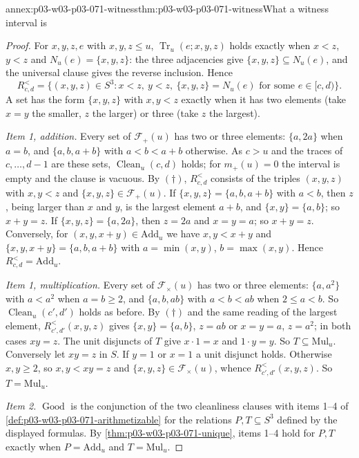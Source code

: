 \begin{annexitem}{annex:p03-w03-p03-071-witness}{thm:p03-w03-p03-071-witness}{What a witness interval is}
\begin{proof}
For \(x,y,z,e\) with \(x,y,z\leq u\), \(\operatorname{Tr}_u(e;x,y,z)\) holds
exactly when \(x<z\), \(y<z\) and \(N_u(e)=\{x,y,z\}\): the three adjacencies
give \(\{x,y,z\}\subseteq N_u(e)\), and the universal clause gives the
reverse inclusion.  Hence
\[
  R^<_{c,d}=\{(x,y,z)\in S^3:x<z,\ y<z,\ \{x,y,z\}=N_u(e)\text{ for some }
  e\in[c,d)\}. \tag{\(\dagger\)}
\]
A set has the form \(\{x,y,z\}\) with \(x,y<z\) exactly when it has two
elements (take \(x=y\) the smaller, \(z\) the larger) or three (take \(z\)
the largest).

\emph{Item 1, addition.}  Every set of \(\mathcal F_+(u)\) has two or three
elements: \(\{a,2a\}\) when \(a=b\), and \(\{a,b,a+b\}\) with
\(a<b<a+b\) otherwise.  As \(c>u\) and the traces of \(c,\ldots,d-1\) are
these sets, \(\operatorname{Clean}_u(c,d)\) holds; for \(m_+(u)=0\) the
interval is empty and the clause is vacuous.  By \((\dagger)\),
\(R^<_{c,d}\) consists of the triples \((x,y,z)\) with \(x,y<z\) and
\(\{x,y,z\}\in\mathcal F_+(u)\).  If \(\{x,y,z\}=\{a,b,a+b\}\) with
\(a<b\), then \(z\), being larger than \(x\) and \(y\), is the largest
element \(a+b\), and \(\{x,y\}=\{a,b\}\); so \(x+y=z\).  If
\(\{x,y,z\}=\{a,2a\}\), then \(z=2a\) and \(x=y=a\); so \(x+y=z\).
Conversely, for \((x,y,x+y)\in\mathrm{Add}_u\) we have \(x,y<x+y\) and
\(\{x,y,x+y\}=\{a,b,a+b\}\) with \(a=\min(x,y)\), \(b=\max(x,y)\).  Hence
\(R^<_{c,d}=\mathrm{Add}_u\).

\emph{Item 1, multiplication.}  Every set of \(\mathcal F_\times(u)\) has two
or three elements: \(\{a,a^2\}\) with \(a<a^2\) when \(a=b\geq2\), and
\(\{a,b,ab\}\) with \(a<b<ab\) when \(2\leq a<b\).  So
\(\operatorname{Clean}_u(c',d')\) holds as before.  By \((\dagger)\) and the
same reading of the largest element, \(R^<_{c',d'}(x,y,z)\) gives
\(\{x,y\}=\{a,b\}\), \(z=ab\) or \(x=y=a\), \(z=a^2\); in both cases
\(xy=z\).  The unit disjuncts of \(T\) give \(x\cdot1=x\) and \(1\cdot y=y\).
So \(T\subseteq\mathrm{Mul}_u\).  Conversely let \(xy=z\) in \(S\).  If
\(y=1\) or \(x=1\) a unit disjunct holds.  Otherwise \(x,y\geq2\), so
\(x,y<xy=z\) and \(\{x,y,z\}\in\mathcal F_\times(u)\), whence
\(R^<_{c',d'}(x,y,z)\).  So \(T=\mathrm{Mul}_u\).

\emph{Item 2.}  \(\operatorname{Good}\) is the conjunction of the two
cleanliness clauses with items 1--4 of
\cref{def:p03-w03-p03-071-arithmetizable} for the relations \(P,T\subseteq
S^3\) defined by the displayed formulas.  By
\cref{thm:p03-w03-p03-071-unique}, items 1--4 hold for \(P,T\) exactly when
\(P=\mathrm{Add}_u\) and \(T=\mathrm{Mul}_u\).


\end{proof}
\end{annexitem}
